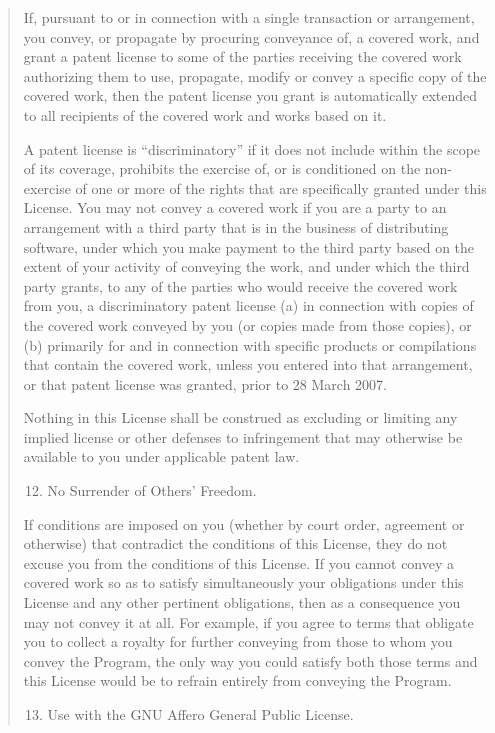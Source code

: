 \documentclass[letterpaper,10pt,english]{sphinxmanual}
\begin{document}
\begin{quote}
If, pursuant to or in connection with a single transaction or
arrangement, you convey, or propagate by procuring conveyance of, a
covered work, and grant a patent license to some of the parties
receiving the covered work authorizing them to use, propagate, modify
or convey a specific copy of the covered work, then the patent license
you grant is automatically extended to all recipients of the covered
work and works based on it.

A patent license is ``discriminatory'' if it does not include within
the scope of its coverage, prohibits the exercise of, or is
conditioned on the non-exercise of one or more of the rights that are
specifically granted under this License.  You may not convey a covered
work if you are a party to an arrangement with a third party that is
in the business of distributing software, under which you make payment
to the third party based on the extent of your activity of conveying
the work, and under which the third party grants, to any of the
parties who would receive the covered work from you, a discriminatory
patent license (a) in connection with copies of the covered work
conveyed by you (or copies made from those copies), or (b) primarily
for and in connection with specific products or compilations that
contain the covered work, unless you entered into that arrangement,
or that patent license was granted, prior to 28 March 2007.

Nothing in this License shall be construed as excluding or limiting
any implied license or other defenses to infringement that may
otherwise be available to you under applicable patent law.
\begin{enumerate}
\setcounter{enumi}{11}
\item {} 
No Surrender of Others' Freedom.

\end{enumerate}

If conditions are imposed on you (whether by court order, agreement or
otherwise) that contradict the conditions of this License, they do not
excuse you from the conditions of this License.  If you cannot convey a
covered work so as to satisfy simultaneously your obligations under this
License and any other pertinent obligations, then as a consequence you may
not convey it at all.  For example, if you agree to terms that obligate you
to collect a royalty for further conveying from those to whom you convey
the Program, the only way you could satisfy both those terms and this
License would be to refrain entirely from conveying the Program.
\begin{enumerate}
\setcounter{enumi}{12}
\item {} 
Use with the GNU Affero General Public License.


\end{enumerate}
\end{quote}
\end{document}
